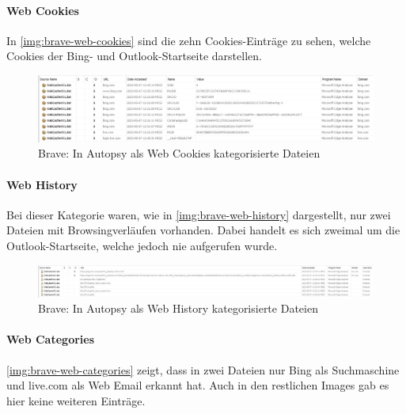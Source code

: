 \begin{appendices}
\paragraph*{Web Cookies}\label{chap:anhang-brave-uncommon-locations-autopsy-web-cookies}
In \autoref{img:brave-web-cookies} sind die zehn Cookies-Einträge zu sehen, welche Cookies der Bing- und Outlook-Startseite darstellen. 

\begin{figure}[ht]
	\centering
	\includegraphics[width=\textwidth]{bilder/BRCoo.png}
	\caption{Brave: In Autopsy als \glqq{}Web Cookies\grqq{} kategorisierte Dateien}
	\label{img:brave-web-cookies}  
\end{figure}

\paragraph*{Web History}\label{chap:anhang-brave-uncommon-locations-autopsy-web-history}

Bei dieser Kategorie waren, wie in \autoref{img:brave-web-history} dargestellt, nur zwei Dateien mit Browsingverläufen vorhanden. Dabei handelt es sich zweimal um die Outlook-Startseite, welche jedoch nie aufgerufen wurde.

\begin{figure}[ht]
	\centering
	\includegraphics[width=\textwidth]{bilder/BRHis.png}
	\caption{Brave: In Autopsy als \glqq{}Web History\grqq{} kategorisierte Dateien}
	\label{img:brave-web-history}  
\end{figure}

\paragraph*{Web Categories}\label{chap:anhang-brave-uncommon-locations-autopsy-web-categories}
\autoref{img:brave-web-categories} zeigt, dass in zwei Dateien nur Bing als Suchmaschine und live.com als \glqq{}Web Email\grqq{} erkannt hat. Auch in den restlichen Images gab es hier keine weiteren Einträge.


\end{appendices}
